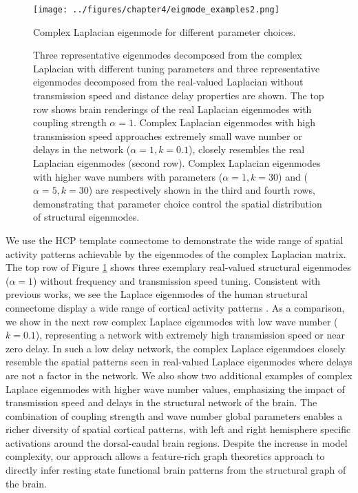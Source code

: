 \begin{figure}[htbp]
 \centering
 \texttt{[image: ../figures/chapter4/eigmode\_examples2.png]}
 \caption{Complex Laplacian eigenmode for different parameter choices.} 
 \caption*{Three representative eigenmodes decomposed from the complex Laplacian with different tuning parameters and three representative eigenmodes decomposed from the real-valued Laplacian without transmission speed and distance delay properties are shown. The top row shows brain renderings of the real Laplacian eigenmodes with coupling strength $\alpha = 1$. Complex Laplacian eigenmodes with high transmission speed approaches extremely small wave number or delays in the network ($\alpha = 1, k = 0.1$), closely resembles the real Laplacian eigenmodes (second row). Complex Laplacian eigenmodes with higher wave numbers with parameters ($\alpha = 1, k = 30$) and ($\alpha = 5, k = 30$) are respectively shown in the third and fourth rows, demonstrating that parameter choice control the spatial distribution of structural eigenmodes.}
 \label{fig:fig2}
\end{figure}

We use the HCP template connectome to demonstrate the wide range of spatial activity patterns achievable by the eigenmodes of the complex Laplacian matrix. The top row of Figure \ref{fig:fig2} shows three exemplary real-valued structural eigenmodes ($\alpha = 1$) without frequency and transmission speed tuning. Consistent with previous works, we see the Laplace eigenmodes of the human structural connectome display a wide range of cortical activity patterns \cite{Abdelnour2018, Atasoy2016}. As a comparison, we show in the next row complex Laplace eigenmodes with low wave number ($k=0.1$), representing a network with extremely high transmission speed or near zero delay. In such a low delay network, the complex Laplace eigenmdoes closely resemble the spatial patterns seen in real-valued Laplace eigenmodes where delays are not a factor in the network. We also show two additional examples of complex Laplace eigenmodes with higher wave number values, emphasizing the impact of transmission speed and delays in the structural network of the brain. The combination of coupling strength and wave number global parameters enables a richer diversity of spatial cortical patterns, with left and right hemisphere specific activations around the dorsal-caudal brain regions. Despite the increase in model complexity, our approach allows a feature-rich graph theoretics approach to directly infer resting state functional brain patterns from the structural graph of the brain. 

